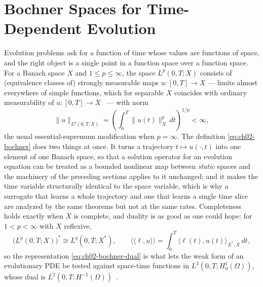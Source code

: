 
\section{Bochner Spaces for Time-Dependent Evolution}

Evolution problems ask for a function of time whose values are functions of space, and the right object is a single point in a function space over a function space. For a Banach space $X$ and $1 \le p \le \infty$, the space $L^p(0,T;X)$ consists of (equivalence classes of) strongly measurable maps $u : [0,T] \to X$ --- limits almost everywhere of simple functions, which for separable $X$ coincides with ordinary measurability of $u : [0,T] \to X$~\cite{brezis2011functional} --- with norm
\begin{equation}
  \|u\|_{L^p(0, T; X)} = \left( \int_0^T \|u(t)\|_X^p \, dt \right)^{1/p} < \infty,
  \label{eq:ch02-bochner}
\end{equation}
the usual essential-supremum modification when $p = \infty$. The definition \eqref{eq:ch02-bochner} does two things at once. It turns a trajectory $t \mapsto u(\cdot,t)$ into one element of one Banach space, so that a solution operator for an evolution equation can be treated as a bounded nonlinear map between \emph{static} spaces and the machinery of the preceding sections applies to it unchanged; and it makes the time variable structurally identical to the space variable, which is why a surrogate that learns a whole trajectory and one that learns a single time slice are analyzed by the same theorems but not at the same rates. Completeness holds exactly when $X$ is complete, and duality is as good as one could hope: for $1 < p < \infty$ with $X$ reflexive,
\begin{equation}
  \big(L^p(0,T;X)\big)^* \cong L^q(0,T;X^*), \qquad
  \langle\!\langle \ell, u \rangle\!\rangle = \int_0^T \langle \ell(t), u(t) \rangle_{X^*, X} \, dt ,
  \label{eq:ch02-bochner-dual}
\end{equation}
so the representation \eqref{eq:ch02-bochner-dual} is what lets the weak form of an evolutionary PDE be tested against space-time functions in $L^2(0,T;H^1_0(\Omega))$, whose dual is $L^2(0,T;H^{-1}(\Omega))$~\cite{evans2010partial}. 

